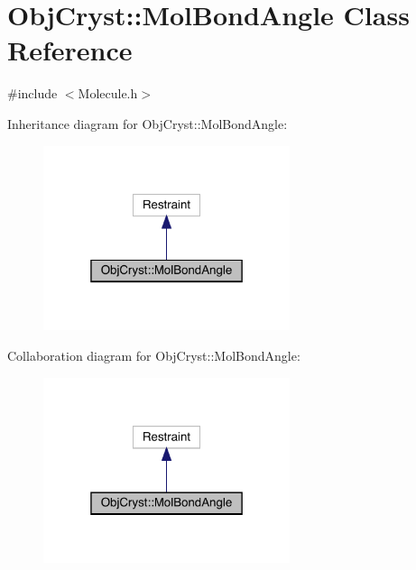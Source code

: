 \hypertarget{class_obj_cryst_1_1_mol_bond_angle}{}\section{Obj\+Cryst\+::Mol\+Bond\+Angle Class Reference}
\label{class_obj_cryst_1_1_mol_bond_angle}


{\ttfamily \#include $<$Molecule.\+h$>$}



Inheritance diagram for Obj\+Cryst\+::Mol\+Bond\+Angle\+:
\nopagebreak
\begin{figure}[H]
\begin{center}
\leavevmode
\includegraphics[width=205pt]{class_obj_cryst_1_1_mol_bond_angle__inherit__graph}
\end{center}
\end{figure}


Collaboration diagram for Obj\+Cryst\+::Mol\+Bond\+Angle\+:
\nopagebreak
\begin{figure}[H]
\begin{center}
\leavevmode
\includegraphics[width=205pt]{class_obj_cryst_1_1_mol_bond_angle__coll__graph}
\end{center}
\end{figure}
